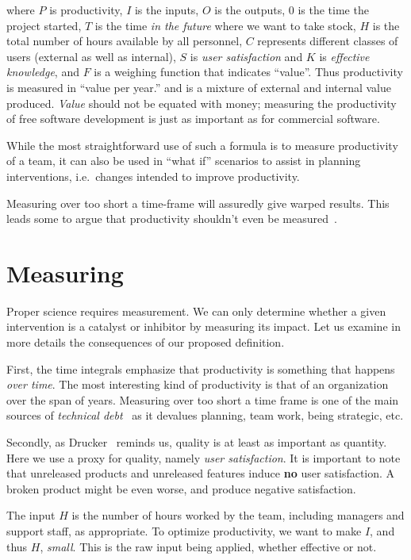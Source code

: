 \documentclass[sigconf, authorversion, nonacm]{acmart}
\begin{document}
\noindent where $P$ is productivity, $I$ is the inputs, $O$ is the outputs, $0$
is the time the project started, $T$ is the time \emph{in the future} where we
want to take stock, $H$ is the total number of hours available by all personnel,
$C$ represents different classes of users (external as well as internal), $S$ is
\emph{user satisfaction} and $K$ is \emph{effective knowledge}, and $F$ is a
weighing function that indicates ``value''.  Thus productivity is
measured in ``value per year.''  and is a mixture of external and internal
value produced. \emph{Value} should not be equated with money; measuring
the productivity of free software development is just as important as for
commercial software.

While the most straightforward use of such a formula is to measure productivity
of a team, it can also be used in ``what if'' scenarios to assist in planning
interventions, i.e.\ changes intended to improve productivity.

Measuring over too short a time-frame will assuredly give
warped results. This leads some to argue that productivity shouldn't even
be measured~\cite{Ko2019}.

\section{Measuring}

Proper science requires measurement.  We can only determine whether a given
intervention is a catalyst or inhibitor by measuring its impact.  Let us
examine in more details the consequences of our proposed definition.

First, the time integrals emphasize that productivity is something that happens
\emph{over time}. The most interesting kind of productivity is that of an
organization over the span of years. Measuring over too short a time frame is
one of the main sources of \emph{technical debt}~\cite{KruchtenEtAl2012} as it
devalues planning, team work, being strategic, etc.

Secondly, as Drucker~\cite{Drucker1999} reminds us, quality is at least as
important as quantity. Here we use a proxy for quality, namely
\emph{user satisfaction}. It is important to note that unreleased products
and unreleased features induce \textbf{no} user satisfaction. A broken
product might be even worse, and produce negative satisfaction.

The input $H$ is the number of hours worked by the team, including managers
and support staff, as appropriate. To optimize productivity, we want to
make $I$, and thus $H$, \emph{small}. This is the raw input being applied,
whether effective or not.
\end{document}
